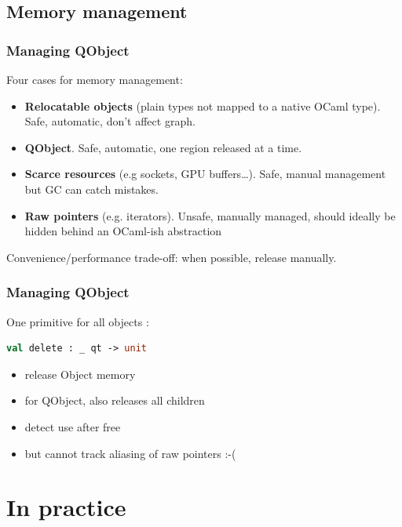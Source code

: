 \documentclass[serif,mathserif]{beamer}
\begin{document}
\subsection{Memory management}

\begin{frame}
  \frametitle{Managing QObject}
  
  Four cases for memory management:

  \begin{itemize}
    \item {\bf Relocatable objects} (plain types not mapped to a native OCaml type).  Safe, automatic, don't affect graph. \pause
    \item {\bf QObject}.
      Safe, automatic, one region released at a time. \pause
    \item {\bf Scarce resources} (e.g sockets, GPU buffers\ldots).
      Safe, manual management but GC can catch mistakes. \pause
    \item {\bf Raw pointers} (e.g. iterators).
      Unsafe, manually managed, should ideally be hidden behind an OCaml-ish
      abstraction \pause
  \end{itemize}

  Convenience/performance trade-off: when possible, release manually.
\end{frame}

\begin{frame}[fragile]
  \frametitle{Managing QObject}

  One primitive for all objects :
  
\begin{lstlisting}[language=Caml,morekeywords={module,sig,end,val}]
val delete : _ qt -> unit
\end{lstlisting}

  \begin{itemize}
    \item release Object memory
    \item for QObject, also releases all children
    \item detect use after free
    \item but cannot track aliasing of raw pointers :-(
  \end{itemize}

\end{frame}

\section{In practice}
\end{document}

